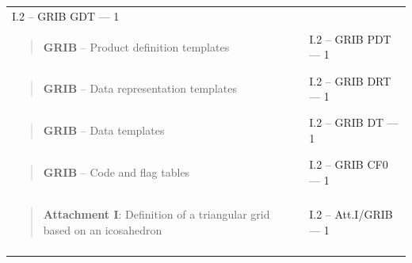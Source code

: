 \begin{longtable}[]{@{}ll@{}}
\begin{minipage}[t]{0.47\columnwidth}
I.2 -- GRIB GDT --- 1\strut
\end{minipage}\tabularnewline
\begin{minipage}[t]{0.47\columnwidth}\raggedright
\begin{quote}
\textbf{GRIB} -- Product definition templates
\end{quote}\strut
\end{minipage} & \begin{minipage}[t]{0.47\columnwidth}\raggedright
I.2 -- GRIB PDT --- 1\strut
\end{minipage}\tabularnewline
\begin{minipage}[t]{0.47\columnwidth}\raggedright
\begin{quote}
\textbf{GRIB} -- Data representation templates
\end{quote}\strut
\end{minipage} & \begin{minipage}[t]{0.47\columnwidth}\raggedright
I.2 -- GRIB DRT --- 1\strut
\end{minipage}\tabularnewline
\begin{minipage}[t]{0.47\columnwidth}\raggedright
\begin{quote}
\textbf{GRIB} -- Data templates
\end{quote}\strut
\end{minipage} & \begin{minipage}[t]{0.47\columnwidth}\raggedright
I.2 -- GRIB DT --- 1\strut
\end{minipage}\tabularnewline
\begin{minipage}[t]{0.47\columnwidth}\raggedright
\begin{quote}
\textbf{GRIB} -- Code and flag tables
\end{quote}\strut
\end{minipage} & \begin{minipage}[t]{0.47\columnwidth}\raggedright
I.2 -- GRIB CF0 --- 1\strut
\end{minipage}\tabularnewline
\begin{minipage}[t]{0.47\columnwidth}\raggedright
\begin{quote}
\textbf{Attachment I}: Definition of a triangular grid based on an icosahedron
\end{quote}\strut
\end{minipage} & \begin{minipage}[t]{0.47\columnwidth}\raggedright
I.2 -- Att.I/GRIB --- 1\strut
\end{minipage}\tabularnewline
\begin{minipage}[t]{0.47\columnwidth}\raggedright

\end{minipage}
\end{longtable}
